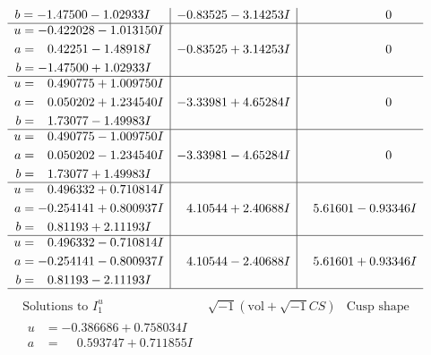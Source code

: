 \documentclass[1p]{elsarticle_modified}
\theoremstyle{definition}
\newcommand{\I}{\sqrt{-1}}
\begin{document}
$$\begin{array}{c|c|c}
\begin{aligned}
b &= -1.47500 - 1.02933 I\end{aligned}
 & -0.83525 - 3.14253 I & \phantom{-0.000000 } 0 \\ \hline\begin{aligned}
u &= -0.422028 - 1.013150 I \\
a &= \phantom{-}0.42251 - 1.48918 I \\
b &= -1.47500 + 1.02933 I\end{aligned}
 & -0.83525 + 3.14253 I & \phantom{-0.000000 } 0 \\ \hline\begin{aligned}
u &= \phantom{-}0.490775 + 1.009750 I \\
a &= \phantom{-}0.050202 + 1.234540 I \\
b &= \phantom{-}1.73077 - 1.49983 I\end{aligned}
 & -3.33981 + 4.65284 I & \phantom{-0.000000 } 0 \\ \hline\begin{aligned}
u &= \phantom{-}0.490775 - 1.009750 I \\
a &= \phantom{-}0.050202 - 1.234540 I \\
b &= \phantom{-}1.73077 + 1.49983 I\end{aligned}
 & -3.33981 - 4.65284 I & \phantom{-0.000000 } 0 \\ \hline\begin{aligned}
u &= \phantom{-}0.496332 + 0.710814 I \\
a &= -0.254141 + 0.800937 I \\
b &= \phantom{-}0.81193 + 2.11193 I\end{aligned}
 & \phantom{-}4.10544 + 2.40688 I & \phantom{-}5.61601 - 0.93346 I \\ \hline\begin{aligned}
u &= \phantom{-}0.496332 - 0.710814 I \\
a &= -0.254141 - 0.800937 I \\
b &= \phantom{-}0.81193 - 2.11193 I\end{aligned}
 & \phantom{-}4.10544 - 2.40688 I & \phantom{-}5.61601 + 0.93346 I\\
 \hline 
 \end{array}$$\newpage$$\begin{array}{c|c|c}  
\text{Solutions to }I^u_{1}& \I (\text{vol} + \sqrt{-1}CS) & \text{Cusp shape}\\
 \hline 
\begin{aligned}
u &= -0.386686 + 0.758034 I \\
a &= \phantom{-}0.593747 + 0.711855 I \\

\end{aligned}
\end{array}$$
\end{document}
